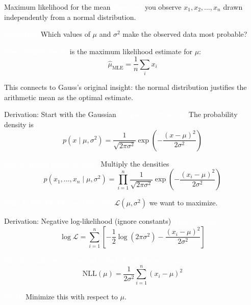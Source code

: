 \documentclass[aspectratio=169]{beamer}
\renewcommand{\textbf}[1]{\textcolor{white}{\bfseries #1}}
\begin{document}
\begin{frame}[c]{Maximum likelihood for the mean}
\textbf{Suppose} you observe $x_1, x_2, \ldots, x_n$ drawn independently from a normal distribution.

\vspace{0.5em}
\textbf{Question:} Which values of $\mu$ and $\sigma^2$ make the observed data most probable?

\vspace{1em}
\textbf{The sample mean} is the maximum likelihood estimate for $\mu$:
\[
\hat{\mu}_{\text{MLE}} = \frac{1}{n} \sum_i x_i
\]

\vspace{0.5em}
This connects to Gauss's original insight: the normal distribution justifies the arithmetic mean as the optimal estimate.
\end{frame}

\begin{frame}[c]{Derivation: Start with the Gaussian}
\textbf{Single observation:} The probability density is
\[
p(x \mid \mu, \sigma^2) = \frac{1}{\sqrt{2\pi\sigma^2}} \exp\left(-\frac{(x - \mu)^2}{2\sigma^2}\right)
\]

\vspace{1em}
\textbf{Independent observations:} Multiply the densities
\[
p(x_1, \ldots, x_n \mid \mu, \sigma^2) = \prod_{i=1}^n \frac{1}{\sqrt{2\pi\sigma^2}} \exp\left(-\frac{(x_i - \mu)^2}{2\sigma^2}\right)
\]

\vspace{1em}
\textbf{This is the likelihood function} $\mathcal{L}(\mu, \sigma^2)$ we want to maximize.
\end{frame}

\begin{frame}[c]{Derivation: Negative log-likelihood (ignore constants)}
\textbf{Take the log:}
\[
\log \mathcal{L} = \sum_{i=1}^n \left[-\frac{1}{2}\log(2\pi\sigma^2) - \frac{(x_i - \mu)^2}{2\sigma^2}\right]
\]

\vspace{1em}
\textbf{Negate and drop constants that don't depend on $\mu$:}
\[
\text{NLL}(\mu) = \frac{1}{2\sigma^2} \sum_{i=1}^n (x_i - \mu)^2
\]

\vspace{1em}
\textbf{Goal:} Minimize this with respect to $\mu$.
\end{frame}
\end{document}
